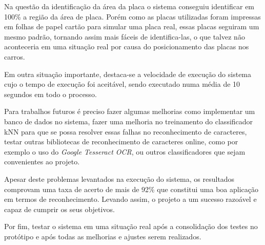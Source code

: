 Na questão da identificação da área da placa o sistema conseguiu identificar em 100\% a região da área de placa. Porém como as placas utilizadas foram impressas em folhas de papel cartão para simular uma placa real, essas placas seguiram um mesmo padrão, tornando assim mais fáceis de identifica-las, o que talvez não aconteceria em uma situação real por causa do posicionamento das placas nos carros.

Em outra situação importante, destaca-se a velocidade de execução do sistema cujo o tempo de execução foi aceitável, sendo executado numa média de 10 segundos em todo o processo.

Para trabalhos futuros é preciso fazer algumas melhorias como implementar um banco de dados no sistema, fazer uma melhoria no treinamento do classificador kNN para que se possa resolver essas falhas no reconhecimento de caracteres, testar outras bibliotecas de reconhecimento de caracteres online, como por exemplo o uso do \textit{Google Tesseract OCR}, ou outros classificadores que sejam convenientes ao projeto.

Apesar deste problemas levantados na execução do sistema, os resultados comprovam uma taxa de acerto de mais de 92\% que constitui uma boa aplicação em termos de reconhecimento. Levando assim, o projeto a um sucesso razoável e capaz de cumprir os seus objetivos. 

Por fim, testar o sistema em uma situação real após a consolidação dos testes no protótipo e após todas as melhorias e ajustes serem realizados.



